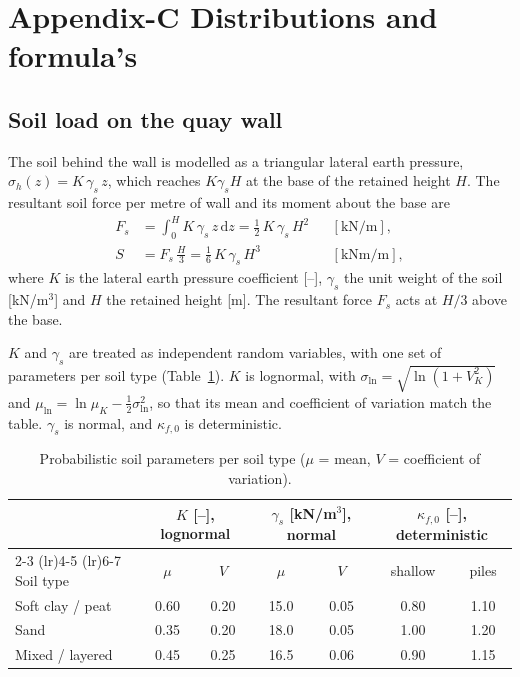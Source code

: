 \section{Appendix-C Distributions and formula's}


\subsection{Soil load on the quay wall}

The soil behind the wall is modelled as a triangular lateral earth pressure,
$\sigma_h(z) = K\,\gamma_s\,z$, which reaches $K\gamma_s H$ at the base of the
retained height $H$. The resultant soil force per metre of wall and its
moment about the base are
\begin{align}
  F_s &= \int_0^H K\,\gamma_s\,z\,\mathrm{d}z = \tfrac{1}{2}\,K\,\gamma_s\,H^2
        && [\mathrm{kN/m}], \label{eq:soil_force}\\
  S   &= F_s\,\frac{H}{3} = \tfrac{1}{6}\,K\,\gamma_s\,H^3
        && [\mathrm{kNm/m}], \label{eq:soil_load}
\end{align}
where $K$ is the lateral earth pressure coefficient [--], $\gamma_s$ the unit
weight of the soil [kN/m$^3$] and $H$ the retained height [m]. The resultant
force $F_s$ acts at $H/3$ above the base.

$K$ and $\gamma_s$ are treated as independent random variables, with one set
of parameters per soil type (Table~\ref{tab:soil_distributions}). $K$ is
lognormal, with $\sigma_{\ln} = \sqrt{\ln(1+V_K^2)}$ and
$\mu_{\ln} = \ln\mu_K - \tfrac{1}{2}\sigma_{\ln}^2$, so that its mean and
coefficient of variation match the table. $\gamma_s$ is normal, and
$\kappa_{f,0}$ is deterministic.

\begin{table}[htbp]
  \centering
  \caption{Probabilistic soil parameters per soil type
           ($\mu$ = mean, $V$ = coefficient of variation).}
  \label{tab:soil_distributions}
  \begin{tabular}{lcccccc}
    \toprule
    & \multicolumn{2}{c}{$K$ [--], lognormal}
    & \multicolumn{2}{c}{$\gamma_s$ [kN/m$^3$], normal}
    & \multicolumn{2}{c}{$\kappa_{f,0}$ [--], deterministic} \\
    \cmidrule(lr){2-3} \cmidrule(lr){4-5} \cmidrule(lr){6-7}
    Soil type & $\mu$ & $V$ & $\mu$ & $V$ & shallow & piles \\
    \midrule
    Soft clay / peat & 0.60 & 0.20 & 15.0 & 0.05 & 0.80 & 1.10 \\
    Sand             & 0.35 & 0.20 & 18.0 & 0.05 & 1.00 & 1.20 \\
    Mixed / layered  & 0.45 & 0.25 & 16.5 & 0.06 & 0.90 & 1.15 \\
    \bottomrule
  \end{tabular}
\end{table}

